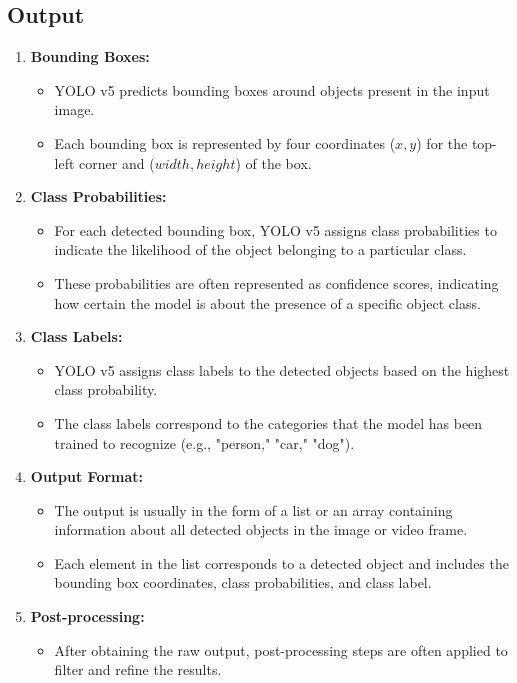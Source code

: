 \subsection{Output}
\begin{enumerate}
	\item \textbf{Bounding Boxes:}
	\begin{itemize}
		\item YOLO v5 predicts bounding boxes around objects present in the input image.
		\item Each bounding box is represented by four coordinates (\(x, y\)) for the top-left corner and (\(width, height\)) of the box.
	\end{itemize}
	\item \textbf{Class Probabilities:}
	\begin{itemize}
		\item For each detected bounding box, YOLO v5 assigns class probabilities to indicate the likelihood of the object belonging to a particular class.
		\item These probabilities are often represented as confidence scores, indicating how certain the model is about the presence of a specific object class.
	\end{itemize}
	\item \textbf{Class Labels:}
	\begin{itemize}
		\item YOLO v5 assigns class labels to the detected objects based on the highest class probability.
		\item The class labels correspond to the categories that the model has been trained to recognize (e.g., "person," "car," "dog").
	\end{itemize}
	\item \textbf{Output Format:}
	\begin{itemize}
		\item The output is usually in the form of a list or an array containing information about all detected objects in the image or video frame.
		\item Each element in the list corresponds to a detected object and includes the bounding box coordinates, class probabilities, and class label.
	\end{itemize}
	\item \textbf{Post-processing:}
	\begin{itemize}
		\item After obtaining the raw output, post-processing steps are often applied to filter and refine the results.

\end{itemize}
\end{enumerate}
